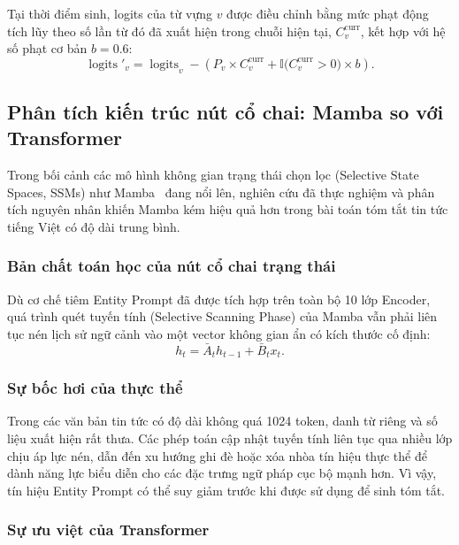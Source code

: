 \documentclass[11pt,a4paper]{article}
\numberwithin{equation}{section}
\newcommand{\ind}{\mathbb{I}}
\begin{document}
Tại thời điểm sinh, logits của từ vựng $v$ được điều chỉnh bằng mức phạt động tích lũy theo số lần từ đó đã xuất hiện trong chuỗi hiện tại, $C_v^{\text{curr}}$, kết hợp với hệ số phạt cơ bản $b=0.6$:
\begin{equation}
\operatorname{logits}'_v
=\operatorname{logits}_v-\left(
P_v\times C_v^{\text{curr}}
+\ind\bigl(C_v^{\text{curr}}>0\bigr)\times b
\right).
\label{eq:logits-modification}
\end{equation}

\subsection{Phân tích kiến trúc nút cổ chai: Mamba so với Transformer}

Trong bối cảnh các mô hình không gian trạng thái chọn lọc (Selective State Spaces, SSMs) như Mamba~\cite{gu2023mamba} đang nổi lên, nghiên cứu đã thực nghiệm và phân tích nguyên nhân khiến Mamba kém hiệu quả hơn trong bài toán tóm tắt tin tức tiếng Việt có độ dài trung bình.

\subsubsection{Bản chất toán học của nút cổ chai trạng thái}

Dù cơ chế tiêm Entity Prompt đã được tích hợp trên toàn bộ 10 lớp Encoder, quá trình quét tuyến tính (Selective Scanning Phase) của Mamba vẫn phải liên tục nén lịch sử ngữ cảnh vào một vector không gian ẩn có kích thước cố định:
\begin{equation}
h_t=\bar{A}_t h_{t-1}+\bar{B}_t x_t.
\label{eq:mamba-state}
\end{equation}

\subsubsection{Sự bốc hơi của thực thể}

Trong các văn bản tin tức có độ dài không quá 1024 token, danh từ riêng và số liệu xuất hiện rất thưa. Các phép toán cập nhật tuyến tính liên tục qua nhiều lớp chịu áp lực nén, dẫn đến xu hướng ghi đè hoặc xóa nhòa tín hiệu thực thể để dành năng lực biểu diễn cho các đặc trưng ngữ pháp cục bộ mạnh hơn. Vì vậy, tín hiệu Entity Prompt có thể suy giảm trước khi được sử dụng để sinh tóm tắt.

\subsubsection{Sự ưu việt của Transformer}
\end{document}
